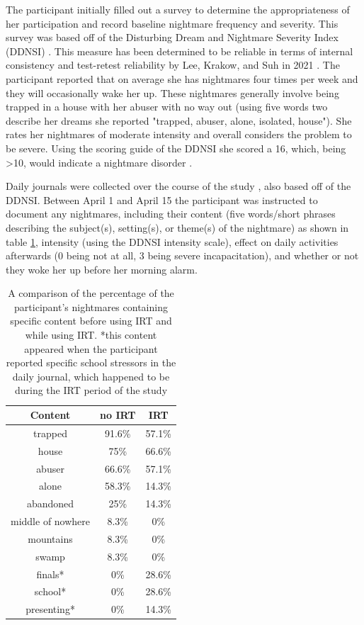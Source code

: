 \documentclass{article}
\begin{document}
The participant initially filled out a survey \cite{IRTIntake} to determine the appropriateness of her participation and record baseline nightmare frequency and severity. This survey was based off of the Disturbing Dream and Nightmare Severity Index (DDNSI) \cite{UPenn}. This measure has been determined to be reliable in terms of internal consistency and test-retest reliability by Lee, Krakow, and Suh in 2021 \cite{Lee}. The participant reported that on average she has nightmares four times per week and they will occasionally wake her up. These nightmares generally involve being trapped in a house with her abuser with no way out (using five words two describe her dreams she reported "trapped, abuser, alone, isolated, house"). She rates her nightmares of moderate intensity and overall considers the problem to be severe. Using the scoring guide of the DDNSI she scored a 16, which, being >10, would indicate a nightmare disorder \cite{UPenn}.

Daily journals were collected over the course of the study \cite{IRTDaily}, also based off of the DDNSI. Between April 1 and April 15 the participant was instructed to document any nightmares, including their content (five words/short phrases describing the subject(s), setting(s), or theme(s) of the nightmare) as shown in table \ref{ContentCompare}, intensity (using the DDNSI intensity scale), effect on daily activities afterwards (0 being not at all, 3 being severe incapacitation), and whether or not they woke her up before her morning alarm.

\begin{table}[htbp]
\centering
\begin{tabular}{||c c c||}
 \hline
 Content& no IRT& IRT\\
 \hline
 trapped & 91.6\% & 57.1\%\\
 house & 75\% & 66.6\% \\
 abuser & 66.6\% & 57.1\% \\
 alone & 58.3\% & 14.3\% \\
 abandoned & 25\% & 14.3\% \\
 middle of nowhere & 8.3\% & 0\% \\
 mountains & 8.3\% & 0\% \\
 swamp & 8.3\% & 0\% \\
 finals* & 0\% & 28.6\% \\
 school* & 0\% & 28.6\% \\
 presenting* & 0\% & 14.3\% \\
 \hline
\end{tabular}
\caption{A comparison of the percentage of the participant's nightmares containing specific content before using IRT and while using IRT. *this content appeared when the participant reported specific school stressors in the daily journal, which happened to be during the IRT period of the study}
\label{ContentCompare}
\end{table}
\end{document}
